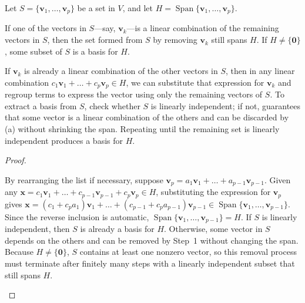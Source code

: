 \documentclass[10pt]{scrartcl}
\newcommand{\vv}[1]{\mathbf{#1}}
\DeclareMathOperator{\spn}{Span}\DeclareMathOperator{\Nul}{Nul}\DeclareMathOperator{\Col}{Col}\DeclareMathOperator{\Row}{Row}\DeclareMathOperator{\nullity}{nullity}
\begin{document}
\begin{theorem*}
  Let $S=\{\vv v_1,\dots,\vv v_p\}$ be a set in $V$, and let $H=\spn\{\vv v_1,\dots,\vv v_p\}$.
  \begin{enumerate}[(a)]
    \ii If one of the vectors in $S$---say, $\vv v_k$---is a linear combination of the remaining vectors in $S$, then the set formed from $S$ by removing $\vv v_k$ still spans $H$.
    \ii If $H\ne\{\vv 0\}$, some subset of $S$ is a basis for $H$.
  \end{enumerate}
\end{theorem*}
\begin{ideabox}
  If $\vv v_k$ is already a linear combination of the other vectors in $S$, then in any linear combination $c_1\vv v_1+\dots+c_p\vv v_p\in H$, we can substitute that expression for $\vv v_k$ and regroup terms to express the vector using only the remaining vectors of $S$. To extract a basis from $S$, check whether $S$ is linearly independent; if not,  guarantees that some vector is a linear combination of the others and can be discarded by (a) without shrinking the span. Repeating until the remaining set is linearly independent produces a basis for $H$.
\end{ideabox}
\begin{proof}
  \begin{steps}
    \ii By rearranging the list if necessary, suppose $\vv v_p=a_1\vv v_1+\dots+a_{p-1}\vv v_{p-1}$. Given any $\vv x=c_1\vv v_1+\dots+c_{p-1}\vv v_{p-1}+c_p\vv v_p\in H$, substituting the expression for $\vv v_p$ gives $\vv x=(c_1+c_pa_1)\vv v_1+\dots+(c_{p-1}+c_pa_{p-1})\vv v_{p-1}\in\spn\{\vv v_1,\dots,\vv v_{p-1}\}$. Since the reverse inclusion is automatic, $\spn\{\vv v_1,\dots,\vv v_{p-1}\}=H$.
    \ii If $S$ is linearly independent, then $S$ is already a basis for $H$. Otherwise, some vector in $S$ depends on the others and can be removed by Step~1 without changing the span. Because $H\ne\{\vv 0\}$, $S$ contains at least one nonzero vector, so this removal process must terminate after finitely many steps with a linearly independent subset that still spans $H$.
  \end{steps}
\end{proof}
\end{document}
